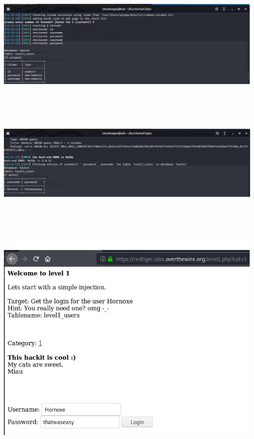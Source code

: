 \documentclass[11pt,letterpaper]{article}
\begin{document}
\begin{center}
\includegraphics[scale=.5]{./Img/sqlmap4.png}
\end{center}~\\~\\~\\
\begin{center}
\includegraphics[scale=.5]{./Img/sqlmap5.png}
\end{center}~\\~\\~\\
\begin{center}
\includegraphics[scale=.6]{./Img/sqlmap6.png}
\end{center}~\\~\\~\\
\end{document}
